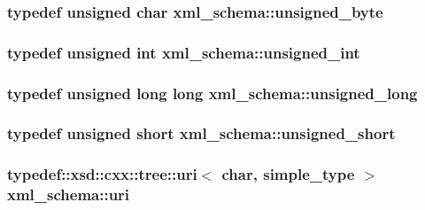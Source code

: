 \subsubsection[{\texorpdfstring{unsigned\+\_\+byte}{unsigned_byte}}]{\setlength{\rightskip}{0pt plus 5cm}typedef unsigned char {\bf xml\+\_\+schema\+::unsigned\+\_\+byte}}\hypertarget{namespacexml__schema_a876b68656d976c6343512f3d44fe8ca2}{}\label{namespacexml__schema_a876b68656d976c6343512f3d44fe8ca2}
\subsubsection[{\texorpdfstring{unsigned\+\_\+int}{unsigned_int}}]{\setlength{\rightskip}{0pt plus 5cm}typedef unsigned int {\bf xml\+\_\+schema\+::unsigned\+\_\+int}}\hypertarget{namespacexml__schema_a85ca3205d8af287e149aac54535f57e7}{}\label{namespacexml__schema_a85ca3205d8af287e149aac54535f57e7}
\subsubsection[{\texorpdfstring{unsigned\+\_\+long}{unsigned_long}}]{\setlength{\rightskip}{0pt plus 5cm}typedef unsigned long long {\bf xml\+\_\+schema\+::unsigned\+\_\+long}}\hypertarget{namespacexml__schema_a4413fbcf4c65ffc7aaafe465d72fcb33}{}\label{namespacexml__schema_a4413fbcf4c65ffc7aaafe465d72fcb33}
\subsubsection[{\texorpdfstring{unsigned\+\_\+short}{unsigned_short}}]{\setlength{\rightskip}{0pt plus 5cm}typedef unsigned short {\bf xml\+\_\+schema\+::unsigned\+\_\+short}}\hypertarget{namespacexml__schema_a7fc7b4a846c512c370346e15dfdcecaa}{}\label{namespacexml__schema_a7fc7b4a846c512c370346e15dfdcecaa}
\subsubsection[{\texorpdfstring{uri}{uri}}]{\setlength{\rightskip}{0pt plus 5cm}typedef\+::xsd\+::cxx\+::tree\+::uri$<$ char, {\bf simple\+\_\+type} $>$ {\bf xml\+\_\+schema\+::uri}}\hypertarget{namespacexml__schema_aad28b7e5769e04950db7f4bd15c163be}{}\label{namespacexml__schema_aad28b7e5769e04950db7f4bd15c163be}
